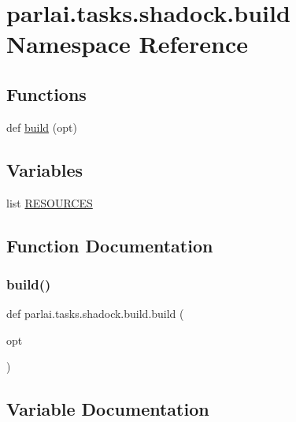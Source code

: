 \hypertarget{namespaceparlai_1_1tasks_1_1shadock_1_1build}{}\section{parlai.\+tasks.\+shadock.\+build Namespace Reference}
\label{namespaceparlai_1_1tasks_1_1shadock_1_1build}
\subsection*{Functions}
\begin{DoxyCompactItemize}
\item 
def \hyperlink{namespaceparlai_1_1tasks_1_1shadock_1_1build_a5d6e87fcb7bff465b029bf7cd3031c0a}{build} (opt)
\end{DoxyCompactItemize}
\subsection*{Variables}
\begin{DoxyCompactItemize}
\item 
list \hyperlink{namespaceparlai_1_1tasks_1_1shadock_1_1build_a5e43ba2e667093875f5c4f98ea1e3501}{R\+E\+S\+O\+U\+R\+C\+ES}
\end{DoxyCompactItemize}


\subsection{Function Documentation}
\mbox{\label{namespaceparlai_1_1tasks_1_1shadock_1_1build_a5d6e87fcb7bff465b029bf7cd3031c0a}} 
\subsubsection{\texorpdfstring{build()}{build()}}
{\footnotesize\ttfamily def parlai.\+tasks.\+shadock.\+build.\+build (\begin{DoxyParamCaption}\item[{}]{opt }\end{DoxyParamCaption})}



\subsection{Variable Documentation}
\mbox{\label{namespaceparlai_1_1tasks_1_1shadock_1_1build_a5e43ba2e667093875f5c4f98ea1e3501}} 
